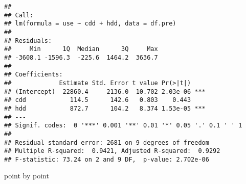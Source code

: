 \documentclass[
]{article}
\begin{document}
\begin{verbatim}
## 
## Call:
## lm(formula = use ~ cdd + hdd, data = df.pre)
## 
## Residuals:
##     Min      1Q  Median      3Q     Max 
## -3608.1 -1596.3  -225.6  1464.2  3636.7 
## 
## Coefficients:
##             Estimate Std. Error t value Pr(>|t|)    
## (Intercept)  22860.4     2136.0  10.702 2.03e-06 ***
## cdd            114.5      142.6   0.803    0.443    
## hdd            872.7      104.2   8.374 1.53e-05 ***
## ---
## Signif. codes:  0 '***' 0.001 '**' 0.01 '*' 0.05 '.' 0.1 ' ' 1
## 
## Residual standard error: 2681 on 9 degrees of freedom
## Multiple R-squared:  0.9421, Adjusted R-squared:  0.9292 
## F-statistic: 73.24 on 2 and 9 DF,  p-value: 2.702e-06
\end{verbatim}

point by point
\end{document}
